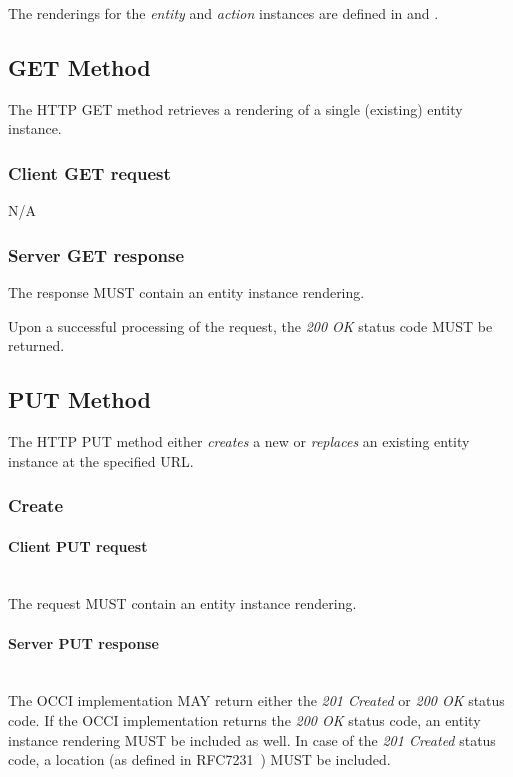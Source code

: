 \documentclass[10pt,a4paper]{article}
\begin{document}
The renderings for the {\em entity} and {\em action} instances are defined in \cite{occi:text} and \cite{occi:json}.

\subsection{GET Method}
The HTTP GET method retrieves a rendering of a single (existing) entity instance.

\subsubsection*{Client GET request}
N/A

\subsubsection*{Server GET response}
The response MUST contain an entity instance rendering.

Upon a successful processing of the request, the \emph{200 OK} status code MUST be returned.

\subsection{PUT Method}
The HTTP PUT method either {\em creates} a new or {\em replaces} an existing
entity instance at the specified URL.

\subsubsection{Create}

\paragraph*{Client PUT request}\hfill\\
The request MUST contain an entity instance rendering.

\paragraph*{Server PUT response}\hfill\\
The OCCI implementation MAY return either the \emph{201 Created} or \emph{200 OK} status code. If the OCCI implementation
returns the \emph{200 OK} status code, an entity instance rendering MUST be included as well.
In case of the \emph{201 Created} status code, a location (as defined in RFC7231~\cite{rfc7231}) MUST be included.
\end{document}
